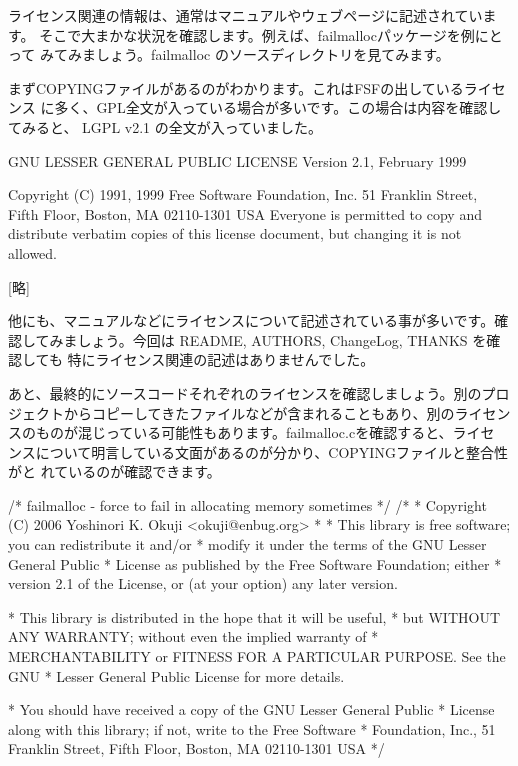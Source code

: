 \documentclass[mingoth,a4paper]{jsarticle}
\begin{document}
ライセンス関連の情報は、通常はマニュアルやウェブページに記述されています。
そこで大まかな状況を確認します。例えば、failmallocパッケージを例にとって
みてみましょう。failmalloc のソースディレクトリを見てみます。


まずCOPYINGファイルがあるのがわかります。これはFSFの出しているライセンス
に多く、GPL全文が入っている場合が多いです。この場合は内容を確認してみると、
LGPL v2.1 の全文が入っていました。

\begin{commandline}
                  GNU LESSER GENERAL PUBLIC LICENSE
                       Version 2.1, February 1999

 Copyright (C) 1991, 1999 Free Software Foundation, Inc.
 51 Franklin Street, Fifth Floor, Boston, MA  02110-1301  USA
 Everyone is permitted to copy and distribute verbatim copies
 of this license document, but changing it is not allowed.

[略]
\end{commandline}

他にも、マニュアルなどにライセンスについて記述されている事が多いです。確
認してみましょう。今回は README, AUTHORS, ChangeLog, THANKS を確認しても
特にライセンス関連の記述はありませんでした。

あと、最終的にソースコードそれぞれのライセンスを確認しましょう。別のプロ
ジェクトからコピーしてきたファイルなどが含まれることもあり、別のライセン
スのものが混じっている可能性もあります。failmalloc.cを確認すると、ライセ
ンスについて明言している文面があるのが分かり、COPYINGファイルと整合性がと
れているのが確認できます。

\begin{commandline}
/* failmalloc - force to fail in allocating memory sometimes */
/*
 * Copyright (C) 2006 Yoshinori K. Okuji <okuji@enbug.org>
 *
 * This library is free software; you can redistribute it and/or
 * modify it under the terms of the GNU Lesser General Public
 * License as published by the Free Software Foundation; either
 * version 2.1 of the License, or (at your option) any later version.

 * This library is distributed in the hope that it will be useful,
 * but WITHOUT ANY WARRANTY; without even the implied warranty of
 * MERCHANTABILITY or FITNESS FOR A PARTICULAR PURPOSE.  See the GNU
 * Lesser General Public License for more details.

 * You should have received a copy of the GNU Lesser General Public
 * License along with this library; if not, write to the Free Software
 * Foundation, Inc., 51 Franklin Street, Fifth Floor, Boston, MA  02110-1301  USA
*/
\end{commandline}
\end{document}
